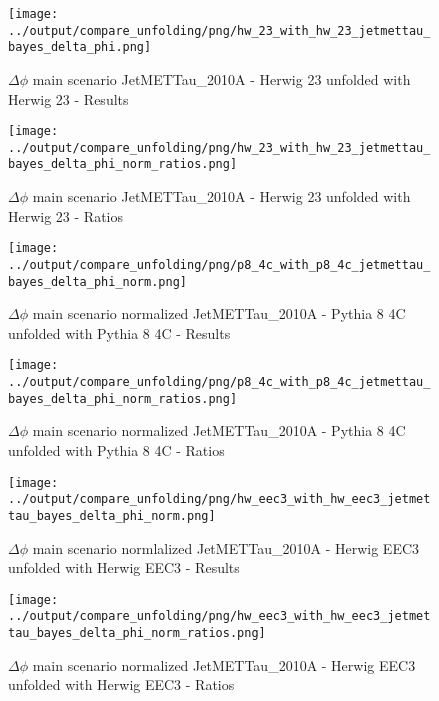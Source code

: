 \documentclass[11pt]{book}
\begin{document}
\begin{figure}[ht]
\centering
\texttt{[image: ../output/compare\_unfolding/png/hw\_23\_with\_hw\_23\_jetmettau\_bayes\_delta\_phi.png]}
\caption{$\Delta\phi$ main scenario JetMETTau\_2010A - Herwig 23 unfolded with Herwig 23 - Results}
\label{hw_23_hw_23_jetmettau_delta_phi_a}
\end{figure}

\begin{figure}[ht]
\centering
\texttt{[image: ../output/compare\_unfolding/png/hw\_23\_with\_hw\_23\_jetmettau\_bayes\_delta\_phi\_norm\_ratios.png]}
\caption{$\Delta\phi$ main scenario JetMETTau\_2010A - Herwig 23 unfolded with Herwig 23 - Ratios}
\label{hw_23_jetmettau_delta_phi_b}
\end{figure}


\begin{figure}[ht]
\centering
\texttt{[image: ../output/compare\_unfolding/png/p8\_4c\_with\_p8\_4c\_jetmettau\_bayes\_delta\_phi\_norm.png]}
\caption{$\Delta\phi$ main scenario normalized JetMETTau\_2010A - Pythia 8 4C unfolded with Pythia 8 4C - Results}
\label{p8_p8_jetmettau_delta_phi_norm_a}
\end{figure}

\begin{figure}[ht]
\centering
\texttt{[image: ../output/compare\_unfolding/png/p8\_4c\_with\_p8\_4c\_jetmettau\_bayes\_delta\_phi\_norm\_ratios.png]}
\caption{$\Delta\phi$ main scenario normalized JetMETTau\_2010A - Pythia 8 4C unfolded with Pythia 8 4C - Ratios}
\label{p8_p8_jetmettau_delta_phi_norm_b}
\end{figure}

\begin{figure}[ht]
\centering
\texttt{[image: ../output/compare\_unfolding/png/hw\_eec3\_with\_hw\_eec3\_jetmettau\_bayes\_delta\_phi\_norm.png]}
\caption{$\Delta\phi$ main scenario normlalized JetMETTau\_2010A - Herwig EEC3 unfolded with Herwig EEC3 - Results}
\label{hw_eec3_hw_eec3_jetmettau_delta_phi_norm_a}
\end{figure}

\begin{figure}[ht]
\centering
\texttt{[image: ../output/compare\_unfolding/png/hw\_eec3\_with\_hw\_eec3\_jetmettau\_bayes\_delta\_phi\_norm\_ratios.png]}
\caption{$\Delta\phi$ main scenario normalized JetMETTau\_2010A - Herwig EEC3 unfolded with Herwig EEC3 - Ratios}
\label{hw_eec3_jetmettau_delta_phi_norm_b}
\end{figure}
\end{document}
